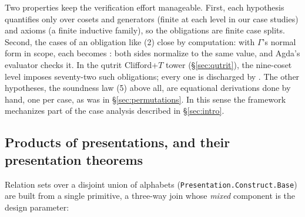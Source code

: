 Two properties keep the verification effort manageable.  First, each
hypothesis quantifies only over cosets and generators (finite
at each level in our case studies) and axioms (a finite inductive family),
so the obligations are finite case splits.  Second, the cases of an obligation like
(2) close by computation: with $\Gamma$'s normal form in scope,
each becomes : both sides normalize to the
same value, and Agda's evaluator checks it.  In the qutrit Clifford+$T$
tower (\S\ref{sec:qutrit}), the nine-coset level imposes seventy-two
such obligations; every
one is discharged by .  The other hypotheses, the soundness
law (5) above all, are equational derivations done by hand, one per
case, as  was in \S\ref{sec:permutations}.  In this
sense the framework mechanizes part of the case analysis described in
\S\ref{sec:intro}.

\subsection{Products of presentations, and their presentation theorems}\label{sec:constructions}

Relation sets over a disjoint union of alphabets
(\texttt{Presentation.Construct.Base}) are built from a single primitive,
a three-way join whose \emph{mixed} component is the design parameter:

